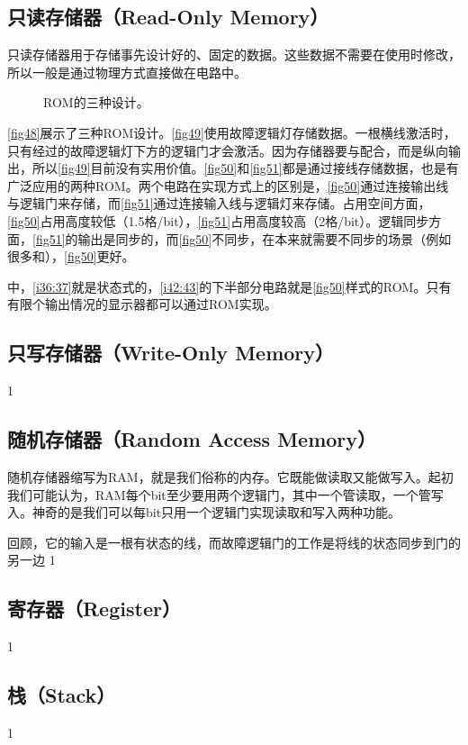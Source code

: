 \subsection{只读存储器（Read-Only Memory）}
只读存储器用于存储事先设计好的、固定的数据。这些数据不需要在使用时修改，所以一般是通过物理方式直接做在电路中。
\begin{figure}[!ht]
  \centering

  \caption{ROM的三种设计。}\label{fig48}
\end{figure}
\autoref{fig48}展示了三种ROM设计。\autoref{fig49}使用故障逻辑灯存储数据。一根横线激活时，只有经过的故障逻辑灯下方的逻辑门才会激活。因为存储器要与\termMUX 配合，而\termMUX 是纵向输出，所以\autoref{fig49}目前没有实用价值。\autoref{fig50}和\autoref{fig51}都是通过接线存储数据，也是有广泛应用的两种ROM。两个电路在实现方式上的区别是，\autoref{fig50}通过连接输出线与逻辑门来存储，而\autoref{fig51}通过连接输入线与逻辑灯来存储。占用空间方面，\autoref{fig50}占用高度较低（1.5格/bit），\autoref{fig51}占用高度较高（2格/bit）。逻辑同步方面，\autoref{fig51}的输出是同步的，而\autoref{fig50}不同步，在本来就需要不同步的场景（例如很多和），\autoref{fig50}更好。

中，\autoref{i36:37}就是状态式的\termMUX ，\autoref{i42:43}的下半部分电路就是\autoref{fig50}样式的ROM。只有有限个输出情况的显示器都可以通过ROM实现。

\subsection{只写存储器（Write-Only Memory）}
1
\subsection{随机存储器（Random Access Memory）}

随机存储器缩写为RAM，就是我们俗称的内存。它既能做读取又能做写入。起初我们可能认为，RAM每个bit至少要用两个逻辑门，其中一个管读取，一个管写入。神奇的是我们可以每bit只用一个逻辑门实现读取和写入两种功能。

回顾，它的输入是一根有状态的线，而故障逻辑门的工作是将线的状态同步到门的另一边
1
\subsection{寄存器（Register）}
1
\subsection{栈（Stack）}
1
